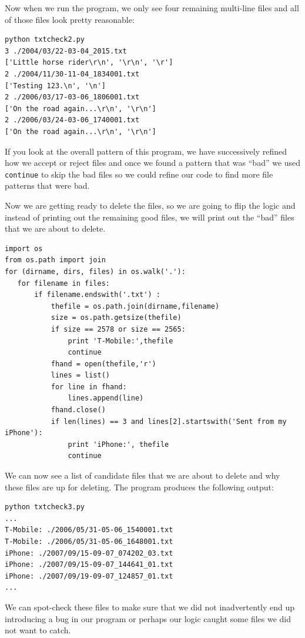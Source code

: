 \documentclass[11pt]{book}
\begin{document}
Now when we run the program, we only see four remaining 
multi-line files and all of those files look pretty reasonable:

\beforeverb
\begin{verbatim}
python txtcheck2.py 
3 ./2004/03/22-03-04_2015.txt
['Little horse rider\r\n', '\r\n', '\r']
2 ./2004/11/30-11-04_1834001.txt
['Testing 123.\n', '\n']
2 ./2006/03/17-03-06_1806001.txt
['On the road again...\r\n', '\r\n']
2 ./2006/03/24-03-06_1740001.txt
['On the road again...\r\n', '\r\n']
\end{verbatim}
\afterverb
%
If you look at the overall pattern of this program,
we have successively refined how we accept or reject
files and once we found a pattern that was ``bad'' we used
{\tt continue} to skip the bad files so we could refine
our code to find more file patterns that were bad.

Now we are getting ready to delete the files, so 
we are going to flip the logic and instead of printing out 
the remaining good files, we will print out the ``bad''
files that we are about to delete.

\beforeverb
\begin{verbatim}
import os
from os.path import join
for (dirname, dirs, files) in os.walk('.'):
   for filename in files:
       if filename.endswith('.txt') :
           thefile = os.path.join(dirname,filename)
           size = os.path.getsize(thefile)
           if size == 2578 or size == 2565:
               print 'T-Mobile:',thefile
               continue
           fhand = open(thefile,'r')
           lines = list()
           for line in fhand:
               lines.append(line)
           fhand.close()
           if len(lines) == 3 and lines[2].startswith('Sent from my iPhone'):
               print 'iPhone:', thefile
               continue
\end{verbatim}
\afterverb
%
We can now see a list of candidate files that we are about
to delete and why these files are up for deleting.
The program produces the following output:

\beforeverb
\begin{verbatim}
python txtcheck3.py
...
T-Mobile: ./2006/05/31-05-06_1540001.txt
T-Mobile: ./2006/05/31-05-06_1648001.txt
iPhone: ./2007/09/15-09-07_074202_03.txt
iPhone: ./2007/09/15-09-07_144641_01.txt
iPhone: ./2007/09/19-09-07_124857_01.txt
...
\end{verbatim}
\afterverb
%
We can spot-check these files to make sure that we did not inadvertently
end up introducing a bug in our program or perhaps our logic 
caught some files we did not want to catch.
\end{document}
